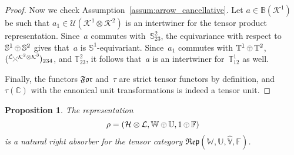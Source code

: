 \documentclass[a4paper]{amsart}
\numberwithin{equation}{section}
\theoremstyle{plain}
\numberwithin{theorem}{section}
\newtheorem{proposition}[theorem]{Proposition}
\theoremstyle{definition}
\theoremstyle{remark}
\newcommand{\tenscorep}{\mathbin{\begin{tikzpicture}[baseline,x=.75ex,y=.75ex] \draw[line width=.2pt] (-0.8,1.15)--(0.8,1.15);\draw[line width=.2pt](0,-0.25)--(0,1.15); \draw[line width=.2pt] (0,0.75) circle [radius = 1];\end{tikzpicture}}}
\newcommand*{\Braiding}[2]{\begin{tikzpicture}[baseline]
    \draw[-] (0,0) -- (1.4ex,1.4ex) node[right,inner sep=0pt] {$\scriptstyle #2$};
    \draw[-,draw=white,line width=2.4pt] (0,1.4ex) -- (1.4ex,0);
    \draw[-] (1.4ex,0) -- (0,1.4ex) node[left,inner sep=0pt] {$\scriptstyle #1$};
  \end{tikzpicture}}
\newcommand*{\Corep}[1]{\mathbb{#1}}          %
\newcommand*{\DuCorep}[1]{\hat{\Corep{#1}}}   %
\newcommand*{\Corepcat}[1]{\mathfrak{Rep}(#1)}%
\newcommand*{\Forget}{\mathfrak{For}}%
\newcommand*{\Trivial}{\tau}%
\newcommand*{\C}{\mathbb C}
\newcommand*{\Bound}{\mathbb B}%
\newcommand*{\Multunit}[1][]{\mathbb W^{#1}}%
\newcommand*{\BrMultunit}{\mathbb F}%
\newcommand*{\Hils}[1][H]{\mathcal{#1}}%
\newcommand*{\U}{\mathcal U}%
\begin{document}
\begin{proof}
  Now we check Assumption~\ref{assum:arrow_cancellative}.  Let
  \(a\in\Bound(\Hils[K]^1)\)
  be such that \(a_1\in\U(\Hils[K]^1\otimes\Hils[K]^2)\)
  is an intertwiner for the tensor product representation.
  Since~\(a\)
  commutes with~\(\Corep{S}^2_{23}\),
  the equivariance with respect to
  \(\Corep{S}^1\tenscorep \Corep{S}^2\)
  gives that~\(a\)
  is \(\Corep{S}^1\)-equivariant.
  Since~\(a_1\)
  commutes with \(\Corep{T}^1\tenscorep\Corep{T}^2\),
  \((\Braiding{\Hils[L]}{\Hils[K]^2 \otimes \Hils[K]^3})_{234}\),
  and \(\Corep{T}^2_{23}\),
  it follows that~\(a\)
  is an intertwiner for~\(\Corep{T}^1_{12}\) as well.

  Finally, the functors \(\Forget\)
  and~\(\Trivial\)
  are strict tensor functors by definition, and~\(\Trivial(\C)\)
  with the canonical unit transformations is indeed a tensor unit.
\end{proof}

\begin{proposition}
  \label{pro:braided_absorber}
  The representation
  \[
  \rho = (\Hils\otimes\Hils[L],
  \Multunit\tenscorep\Corep{U},
  1\tenscorep\BrMultunit)
  \]
  is a natural right absorber for the tensor category
  \(\Corepcat{\Multunit,\Corep{U},\DuCorep{V},\BrMultunit}\).
\end{proposition}
\end{document}
